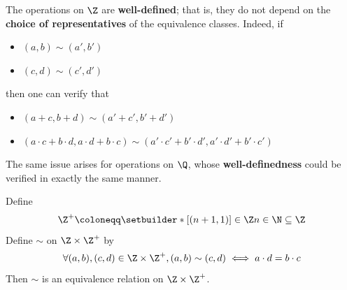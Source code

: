 \bigskip

\begin{remark}
  The operations on $\Z$ are \textbf{well-defined}; that is, they do not depend on the
  \textbf{choice of representatives} of the equivalence classes. Indeed, if
  \begin{itemize}
    \item $(a, b) \sim (a', b')$
    \item $(c, d) \sim (c', d')$
  \end{itemize}
  then one can verify that
  \begin{itemize}
    \item $(a + c, b + d) \sim (a' + c', b' + d')$
    \item $(a \cdot c + b \cdot d, a \cdot d + b \cdot c)
            \sim (a' \cdot c' + b' \cdot d', a' \cdot d' + b' \cdot c')$
  \end{itemize}
  The same issue arises for operations on $\Q$, whose \textbf{well-definedness}
  could be verified in exactly the same manner.
\end{remark}

\bigskip

\begin{theorem} \label{an:thm:rational-construction-relation-is-equivalence}
  Define
  \[
    \Z^{+} \coloneqq \setbuilder*{[(n + 1, 1)] \in \Z}{n \in \N} \subseteq \Z
  \]
  Define $\sim$ on $\Z \times \Z^{+}$ by
  \[
    \forall (a, b), (c, d) \in \Z \times \Z^{+}, (a, b) \sim (c, d) \iff a \cdot d = b \cdot c
  \]
  Then $\sim$ is an equivalence relation on $\Z \times \Z^{+}$.
\end{theorem}

